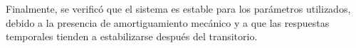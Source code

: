 \documentclass[journal]{IEEEtran}
\begin{document}
Finalmente, se verificó que el sistema es estable para los parámetros utilizados, debido a la presencia de amortiguamiento mecánico y a que las respuestas temporales tienden a estabilizarse después del transitorio.

\printbibliography
\end{document}
